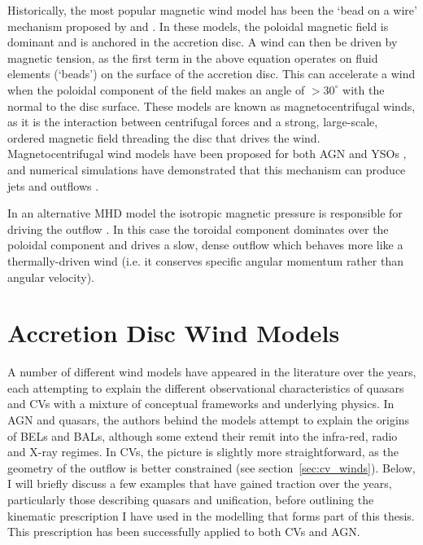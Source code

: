 Historically, the most popular magnetic wind model has been 
the `bead on a wire' mechanism proposed by \cite{blandfordpayne} and 
\cite{pelletier_pudritz}. In these models, 
the poloidal magnetic field is dominant and is anchored in the 
accretion disc. A wind can then be driven by magnetic tension, as the
first term in the above equation operates on fluid elements (`beads') 
on the surface of the accretion disc. This can accelerate
a wind when the poloidal component of the field makes an angle of 
$>30^\circ$ with the normal to the disc surface. These models
are known as magnetocentrifugal winds, as it is the interaction between
centrifugal forces and a strong, large-scale, ordered magnetic field 
threading the disc that drives the wind. 
Magnetocentrifugal wind models have been proposed for both
AGN and YSOs \citep{pelletier_pudritz,konigl1994,kudoh1997},
and numerical simulations have demonstrated that this mechanism can produce
jets and outflows \citep{romanova1997,ouyed1997,ustygova1999}.

In an alternative MHD model the isotropic magnetic pressure 
is responsible for driving the outflow \citep{proga2003a}.
In this case the toroidal component dominates over the poloidal component
and drives a slow, dense outflow which behaves more like a thermally-driven wind 
(i.e. it conserves specific angular momentum rather than angular velocity). 

\section{Accretion Disc Wind Models}
\label{sec:wind_models}

A number of different wind models have appeared in the literature over the 
years, each attempting to explain the different observational characteristics
of quasars and CVs with a mixture of conceptual frameworks and underlying physics.
In AGN and quasars, the authors behind the models attempt to explain the origins of 
BELs and BALs, although some extend their remit into the infra-red, 
radio and X-ray regimes. In CVs, the picture is slightly more straightforward, as 
the geometry of the outflow is better constrained (see section~\ref{sec:cv_winds}).
Below, I will briefly discuss a few examples that have gained traction over the years,
particularly those describing quasars and unification,
before outlining the kinematic prescription I have used in the modelling that forms 
part of this thesis. This prescription has been successfully applied to both CVs 
and AGN.

